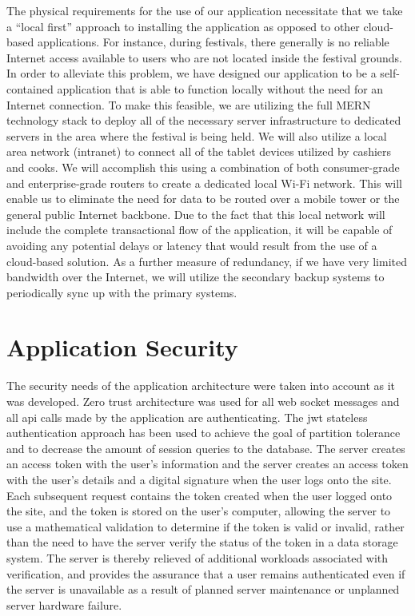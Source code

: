 The physical requirements for the use of our application necessitate that we take a ``local first'' approach to installing the application as opposed to other cloud-based applications. For instance, during festivals, there generally is no reliable Internet access available to users who are not located inside the festival grounds. In order to alleviate this problem, we have designed our application to be a self-contained application that is able to function locally without the need for an Internet connection. To make this feasible, we are utilizing the full MERN technology stack to deploy all of the necessary server infrastructure to dedicated servers in the area where the festival is being held. We will also utilize a local area network (intranet) to connect all of the tablet devices utilized by cashiers and cooks. We will accomplish this using a combination of both consumer-grade and enterprise-grade routers to create a dedicated local Wi-Fi network. This will enable us to eliminate the need for data to be routed over a mobile tower or the general public Internet backbone. Due to the fact that this local network will include the complete transactional flow of the application, it will be capable of avoiding any potential delays or latency that would result from the use of a cloud-based solution. As a further measure of redundancy, if we have very limited bandwidth over the Internet, we will utilize the secondary backup systems to periodically sync up with the primary systems.

\section{Application Security}

The security needs of the application architecture were taken into account as it was developed. Zero trust architecture was used for all web socket messages and all api calls made by the application are authenticating. The jwt stateless authentication approach has been used to achieve the goal of partition tolerance and to decrease the amount of session queries to the database. The server creates an access token with the user's information and the server creates an access token with the user's details and a digital signature when the user logs onto the site. Each subsequent request contains the token created when the user logged onto the site, and the token is stored on the user's computer, allowing the server to use a mathematical validation to determine if the token is valid or invalid, rather than the need to have the server verify the status of the token in a data storage system. The server is thereby relieved of additional workloads associated with verification, and provides the assurance that a user remains authenticated even if the server is unavailable as a result of planned server maintenance or unplanned server hardware failure.

